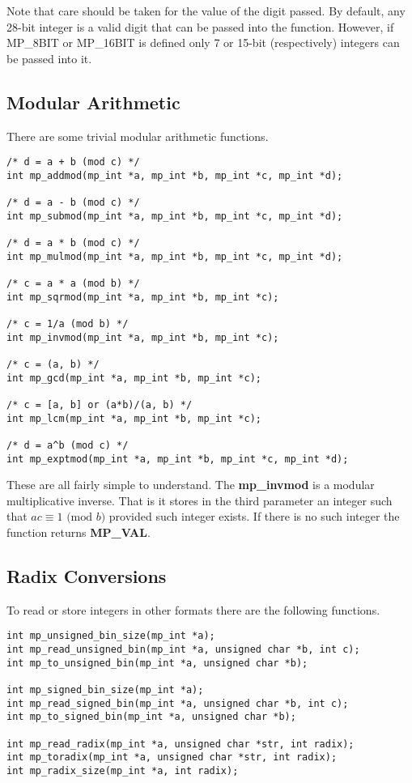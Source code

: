 \documentclass{article}
\begin{document}
Note that care should be taken for the value of the digit passed.  By default, any 28-bit integer is a valid digit that can
be passed into the function.  However, if MP\_8BIT or MP\_16BIT is defined only 7 or 15-bit (respectively) integers 
can be passed into it.

\subsection{Modular Arithmetic}

There are some trivial modular arithmetic functions.

\begin{verbatim}
/* d = a + b (mod c) */
int mp_addmod(mp_int *a, mp_int *b, mp_int *c, mp_int *d);

/* d = a - b (mod c) */
int mp_submod(mp_int *a, mp_int *b, mp_int *c, mp_int *d);

/* d = a * b (mod c) */
int mp_mulmod(mp_int *a, mp_int *b, mp_int *c, mp_int *d);

/* c = a * a (mod b) */
int mp_sqrmod(mp_int *a, mp_int *b, mp_int *c);

/* c = 1/a (mod b) */
int mp_invmod(mp_int *a, mp_int *b, mp_int *c);

/* c = (a, b) */
int mp_gcd(mp_int *a, mp_int *b, mp_int *c);

/* c = [a, b] or (a*b)/(a, b) */
int mp_lcm(mp_int *a, mp_int *b, mp_int *c);

/* d = a^b (mod c) */
int mp_exptmod(mp_int *a, mp_int *b, mp_int *c, mp_int *d);
\end{verbatim}

These are all fairly simple to understand.  The \textbf{mp\_invmod} is a modular multiplicative inverse.  That is it
stores in the third parameter an integer such that $ac \equiv 1 \mbox{ (mod }b\mbox{)}$ provided such integer exists.  If
there is no such integer the function returns \textbf{MP\_VAL}.

\subsection{Radix Conversions}
To read or store integers in other formats there are the following functions.

\begin{verbatim}
int mp_unsigned_bin_size(mp_int *a);
int mp_read_unsigned_bin(mp_int *a, unsigned char *b, int c);
int mp_to_unsigned_bin(mp_int *a, unsigned char *b);

int mp_signed_bin_size(mp_int *a);
int mp_read_signed_bin(mp_int *a, unsigned char *b, int c);
int mp_to_signed_bin(mp_int *a, unsigned char *b);

int mp_read_radix(mp_int *a, unsigned char *str, int radix);
int mp_toradix(mp_int *a, unsigned char *str, int radix);
int mp_radix_size(mp_int *a, int radix);
\end{verbatim}
\end{document}
